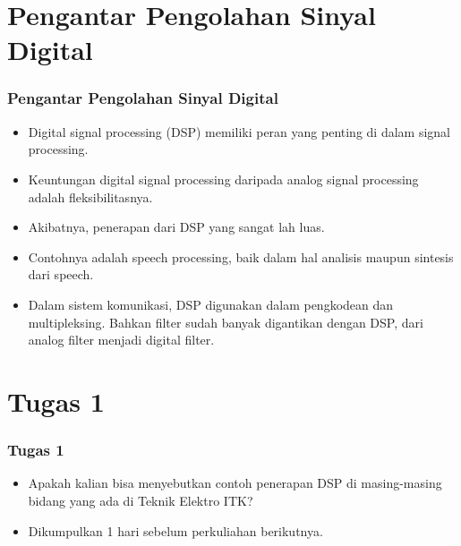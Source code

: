 \documentclass[pdflatex,compress]{beamer}
\begin{document}
\section{Pengantar Pengolahan Sinyal Digital}

\begin{frame}
	\frametitle{Pengantar Pengolahan Sinyal Digital}
	\begin{itemize}
		\item Digital signal processing (DSP) memiliki peran yang penting di dalam signal processing.
		\item Keuntungan digital signal processing daripada analog signal processing adalah fleksibilitasnya.
		\item Akibatnya, penerapan dari DSP yang sangat lah luas.
		\item Contohnya adalah speech processing, baik dalam hal analisis maupun sintesis dari speech.
		\item Dalam sistem komunikasi, DSP digunakan dalam pengkodean dan multipleksing. Bahkan filter sudah banyak digantikan dengan DSP, dari analog filter menjadi digital filter.
	\end{itemize}
\end{frame}

\section{Tugas 1}

\begin{frame}
	\frametitle{Tugas 1}
	\begin{itemize}
		\item Apakah kalian bisa menyebutkan contoh penerapan DSP di masing-masing bidang yang ada di Teknik Elektro ITK?
		\item Dikumpulkan 1 hari sebelum perkuliahan berikutnya.
	\end{itemize}
\end{frame}
\end{document}
